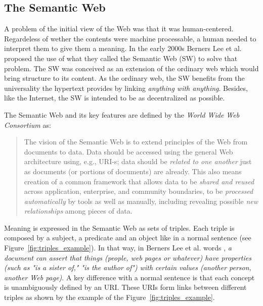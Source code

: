 \subsection{The Semantic Web}

A problem of the initial view of the Web was that it was human-centered.
Regardeless of wether the contents were machine processable, a human needed to interpret them to give them a meaning.
In the early 2000s Berners Lee et al. \cite{berners-lee_semantic_2001} proposed the use of what they called the Semantic Web (SW) to solve that problem.
The SW was conceived as an extension of the ordinary web which would bring structure to its content.
As the ordinary web, the SW benefits from the universality the hypertext provides by linking \emph{anything with anything}.
Besides, like the Internet, the SW is intended to be as decentralized as possible.

The Semantic Web and its key features are defined by the \emph{World Wide Web Consortium} \cite{semanticWeb-FAQ} as:
\begin{quote}
The vision of the Semantic Web is to extend principles of the Web from documents to data.
Data should be accessed using the general Web architecture using, e.g., URI-s;
data should be \emph{related to one another} just as documents (or portions of documents) are already.
This also means creation of a common framework that allows data to be \emph{shared and reused} across application, enterprise, and community boundaries,
to be \emph{processed automatically} by tools as well as manually, including revealing possible \emph{new relationships} among pieces of data.
\end{quote}

Meaning is expressed in the Semantic Web as sets of triples.
Each triple is composed by a subject, a predicate and an object like in a normal sentence (see Figure~\ref{fig:triples_example}).
In that way, in Berners Lee et al. words \cite{berners-lee_semantic_2001}, \emph{a document can assert that things (people, web pages or whatever) have properties (such as "is a sister of," "is the author of") with certain values (another person, another Web page)}.
A key difference with a normal sentence is that each concept is unambiguously defined by an URI.
These URIs form links between different triples as shown by the example of the Figure~\ref{fig:triples_example}.


